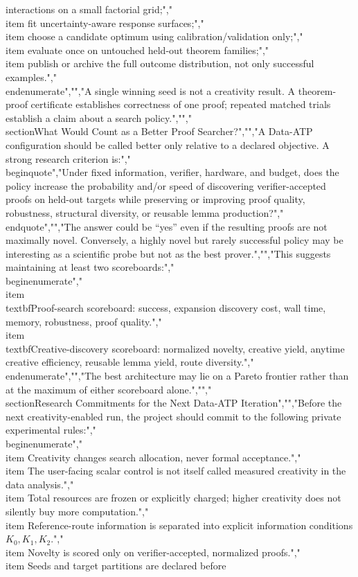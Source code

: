 {{{interactions on a small factorial grid;","\\item fit uncertainty-aware response surfaces;","\\item choose a candidate optimum using calibration/validation only;","\\item evaluate once on untouched held-out theorem families;","\\item publish or archive the full outcome distribution, not only successful examples.","\\end{enumerate}","","A single winning seed is not a creativity result. A theorem-proof certificate establishes correctness of one proof; repeated matched trials establish a claim about a search policy.","","\\section{What Would Count as a Better Proof Searcher?}","","A Data-ATP configuration should be called better only relative to a declared objective. A strong research criterion is:","\\begin{quote}","Under fixed information, verifier, hardware, and budget, does the policy increase the probability and/or speed of discovering verifier-accepted proofs on held-out targets while preserving or improving proof quality, robustness, structural diversity, or reusable lemma production?","\\end{quote}","","The answer could be ``yes'' even if the resulting proofs are not maximally novel. Conversely, a highly novel but rarely successful policy may be interesting as a scientific probe but not as the best prover.","","This suggests maintaining at least two scoreboards:","\\begin{enumerate}","\\item \\textbf{Proof-search scoreboard:} success, expansion discovery cost, wall time, memory, robustness, proof quality.","\\item \\textbf{Creative-discovery scoreboard:} normalized novelty, creative yield, anytime creative efficiency, reusable lemma yield, route diversity.","\\end{enumerate}","","The best architecture may lie on a Pareto frontier rather than at the maximum of either scoreboard alone.","","\\section{Research Commitments for the Next Data-ATP Iteration}","","Before the next creativity-enabled run, the project should commit to the following private experimental rules:","\\begin{enumerate}","\\item Creativity changes search allocation, never formal acceptance.","\\item The user-facing scalar control is not itself called measured creativity in the data analysis.","\\item Total resources are frozen or explicitly charged; higher creativity does not silently buy more computation.","\\item Reference-route information is separated into explicit information conditions $K_0,K_1,K_2$.","\\item Novelty is scored only on verifier-accepted, normalized proofs.","\\item Seeds and target partitions are declared before }}}
